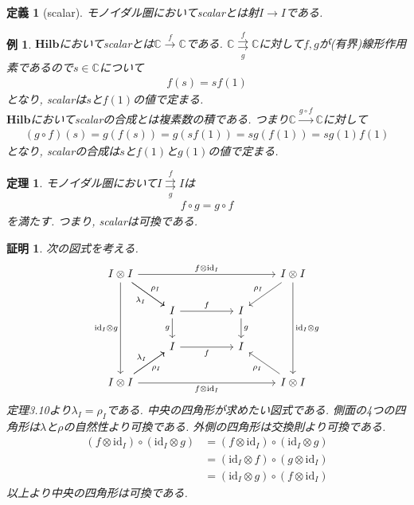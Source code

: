 \documentclass[a4paper,12pt]{ltjsarticle}
\theoremstyle{break}
\newtheorem{defn}[thm]{定義}
\newtheorem{thrm}[thm]{定理}
\newtheorem{eg}[thm]{例}
\newtheorem*{prf}{証明}
\newcommand{\hilb}{\mathbf{Hilb}}
\newcommand{\mbc}{\mathbb{C}}
\newcommand{\xr}[1]{\xrightarrow{#1}}
\newcommand{\id}{\mathrm{id}}
\newcommand{\ci}{\circ}
\newcommand{\la}{\lambda}
\newcommand{\ot}{\otimes}
\numberwithin{equation}{section}
\begin{document}
\begin{defn}[scalar]
  モノイダル圏においてscalarとは射$I \to I$である. 
\end{defn}

\begin{eg}
  $\hilb$においてscalarとは$\mbc \xr{f} \mbc$である. 
  $\mbc \overset{f}{\underset{g}{\rightrightarrows}} \mbc$に対して$f,g$が(有界)線形作用素であるので$s \in \mbc$について
  \begin{align*}
    f(s)=sf(1)
  \end{align*}
  となり, scalarは$s$と$f(1)$の値で定まる. \\
  $\hilb$においてscalarの合成とは複素数の積である. 
  つまり$\mbc \xr{g \ci f} \mbc$に対して
  \begin{align*}
    (g \ci f)(s) = g(f(s)) = g(sf(1)) = sg(f(1)) = sg(1)f(1)
  \end{align*}
  となり, scalarの合成は$s$と$f(1)$と$g(1)$の値で定まる. 
\end{eg}

\begin{thrm}
  モノイダル圏において$I \overset{f}{\underset{g}{\rightrightarrows}} I$は
  \begin{align*}
    f \ci g = g \ci f
  \end{align*}
  を満たす. 
  つまり, scalarは可換である. 
\end{thrm} 

\begin{prf}
  次の図式を考える. 
  \[\begin{tikzcd}
    {I \ot I} &&&& {I \ot I} \\
    & I && I \\
    & I && I \\
    {I \ot I} &&&& {I \ot I}
    \arrow["f", from=2-2, to=2-4]
    \arrow["g"', from=2-2, to=3-2]
    \arrow["f"', from=3-2, to=3-4]
    \arrow["g", from=2-4, to=3-4]
    \arrow["{\la_I}"', from=1-1, to=2-2]
    \arrow["{\id_I \ot g}"', from=1-1, to=4-1]
    \arrow["{f \ot \id_I}"', from=4-1, to=4-5]
    \arrow["{\id_I \ot g}", from=1-5, to=4-5]
    \arrow["{\rho_I}"', from=1-5, to=2-4]
    \arrow["{f \ot \id_I}", from=1-1, to=1-5]
    \arrow["{\la_I}", from=4-1, to=3-2]
    \arrow["{\rho_I}"', from=4-1, to=3-2]
    \arrow["{\rho_I}", from=4-5, to=3-4]
    \arrow["{\rho_I}", from=1-1, to=2-2]
  \end{tikzcd}\]
  定理3.10より$\la_I=\rho_I$である. 
  中央の四角形が求めたい図式である. 
  側面の4つの四角形は$\la$と$\rho$の自然性より可換である. 
  外側の四角形は交換則より可換である. 
  \begin{align*}
    (f \ot \id_I) \ci (\id_I \ot g)
    &= (f \ot \id_I) \ci (\id_I \ot g) \\
    &= (\id_I \ot f) \ci (g \ot \id_I) \\
    &= (\id_I \ot g) \ci (f \ot \id_I)
  \end{align*}
  以上より中央の四角形は可換である. 
\end{prf}
\end{document}
